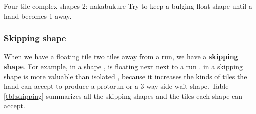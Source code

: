 \vfill
\color{MyRed}
\begin{itembox}[c]{Four-tile complex shapes 2: {\jap nakabukure}}
\normalcolor
Try to keep a bulging float shape until a hand becomes 1-away.
\end{itembox}\normalcolor

\subsubsection{Skipping shape}
When we have a floating tile two tiles away from a run, we have a {\bf skipping shape}. For example, in a shape {\LARGE{}}, {\LARGE{}} is floating next next to a run {\LARGE{}}. {\LARGE{}} in a skipping shape is more valuable than isolated {\LARGE{}}, because it increases the kinds of tiles the hand can accept to produce a protorun or a 3-way side-wait shape. Table \ref{tbl:skipping} summarizes all the skipping shapes and the tiles each shape can accept. 

